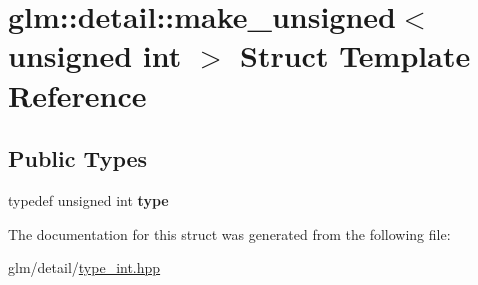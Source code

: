 \hypertarget{structglm_1_1detail_1_1make__unsigned_3_01unsigned_01int_01_4}{\section{glm\-:\-:detail\-:\-:make\-\_\-unsigned$<$ unsigned int $>$ Struct Template Reference}
\label{structglm_1_1detail_1_1make__unsigned_3_01unsigned_01int_01_4}
}
\subsection*{Public Types}
\begin{DoxyCompactItemize}
\item 
\hypertarget{structglm_1_1detail_1_1make__unsigned_3_01unsigned_01int_01_4_aea3e796456b317dd2247889d3fbb9d68}{typedef unsigned int {\bfseries type}}\label{structglm_1_1detail_1_1make__unsigned_3_01unsigned_01int_01_4_aea3e796456b317dd2247889d3fbb9d68}

\end{DoxyCompactItemize}


The documentation for this struct was generated from the following file\-:\begin{DoxyCompactItemize}
\item 
glm/detail/\hyperlink{type__int_8hpp}{type\-\_\-int.\-hpp}\end{DoxyCompactItemize}
